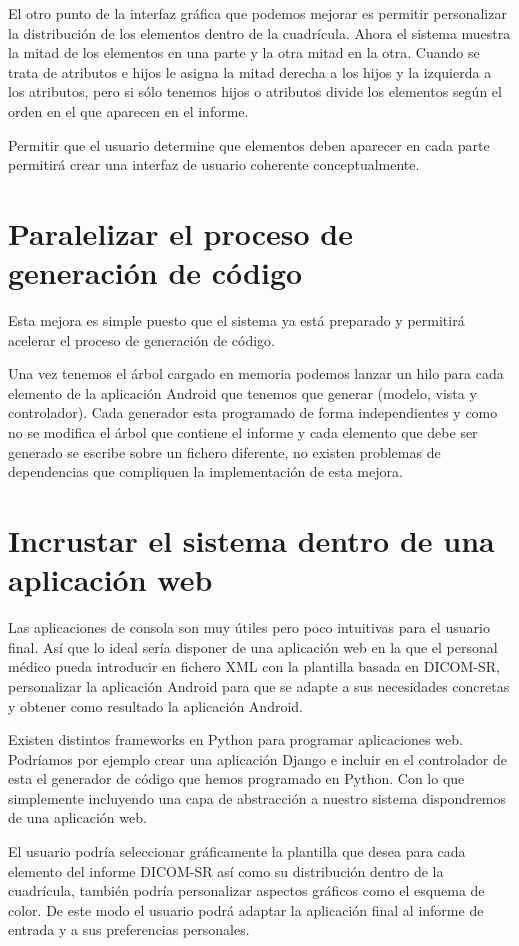 El otro punto de la interfaz gráfica que podemos mejorar es permitir personalizar la distribución de los elementos dentro de la cuadrícula. Ahora el sistema muestra la mitad de los elementos en una parte y la otra mitad en la otra. Cuando se trata de atributos e hijos le asigna la mitad derecha a los hijos y la izquierda a los atributos, pero si sólo tenemos hijos o atributos divide los elementos según el orden en el que aparecen en el informe.\par
Permitir que el usuario determine que elementos deben aparecer en cada parte permitirá crear una interfaz de usuario coherente conceptualmente.\par

\section{Paralelizar el proceso de generación de código}
Esta mejora es simple puesto que el sistema ya está preparado y permitirá acelerar el proceso de generación de código.\par
Una vez tenemos el árbol cargado en memoria podemos lanzar un hilo para cada elemento de la aplicación Android que tenemos que generar (modelo, vista y controlador). Cada generador esta programado de forma independientes y como no se modifica el árbol que contiene el informe y cada elemento que debe ser generado se escribe sobre un fichero diferente, no existen problemas de dependencias que compliquen la implementación de esta mejora. \par


\section{Incrustar el sistema dentro de una aplicación web}
Las aplicaciones de consola son muy útiles pero poco intuitivas para el usuario final. Así que lo ideal sería disponer de una aplicación web en la que el personal médico pueda introducir en fichero XML con la plantilla basada en DICOM-SR, personalizar la aplicación Android  para que se adapte a sus necesidades concretas y obtener como resultado la aplicación Android.\par
Existen distintos frameworks en Python para programar aplicaciones web. Podríamos por ejemplo crear una aplicación Django e incluir en el controlador de esta el generador de código que hemos programado en Python. Con lo que simplemente incluyendo una capa de abstracción a nuestro sistema dispondremos de una aplicación web.\par
El usuario podría seleccionar gráficamente la plantilla que desea para cada elemento del informe DICOM-SR así como su distribución dentro de la cuadrícula, también podría personalizar aspectos gráficos como el esquema de color. De este modo el usuario podrá adaptar la aplicación final al informe de entrada y a sus preferencias personales.\par

